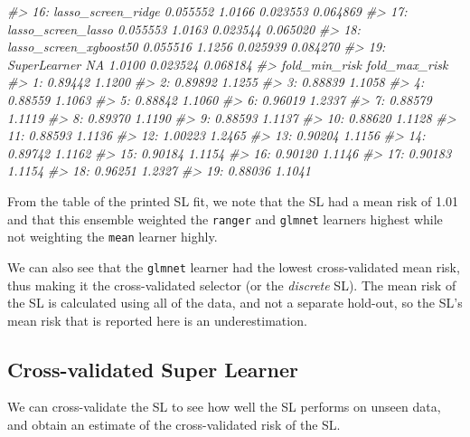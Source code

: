 \documentclass[12pt, krantz2,]{krantz}
\newenvironment{Shaded}{\begin{snugshade}}{\end{snugshade}}
\newcommand{\CommentTok}[1]{\textcolor[rgb]{0.37,0.37,0.37}{\textit{#1}}}
\theoremstyle{definition}
\theoremstyle{definition}
\theoremstyle{definition}
\newcommand{\1}{\mathbbm{1}}
\begin{document}
\begin{Shaded}
\begin{Highlighting}[]
\CommentTok{#> 16:            lasso_screen_ridge     0.055552 1.0166 0.023553 0.064869}
\CommentTok{#> 17:            lasso_screen_lasso     0.055553 1.0163 0.023544 0.065020}
\CommentTok{#> 18:        lasso_screen_xgboost50     0.055516 1.1256 0.025939 0.084270}
\CommentTok{#> 19:                  SuperLearner           NA 1.0100 0.023524 0.068184}
\CommentTok{#>     fold_min_risk fold_max_risk}
\CommentTok{#>  1:       0.89442        1.1200}
\CommentTok{#>  2:       0.89892        1.1255}
\CommentTok{#>  3:       0.88839        1.1058}
\CommentTok{#>  4:       0.88559        1.1063}
\CommentTok{#>  5:       0.88842        1.1060}
\CommentTok{#>  6:       0.96019        1.2337}
\CommentTok{#>  7:       0.88579        1.1119}
\CommentTok{#>  8:       0.89370        1.1190}
\CommentTok{#>  9:       0.88593        1.1137}
\CommentTok{#> 10:       0.88620        1.1128}
\CommentTok{#> 11:       0.88593        1.1136}
\CommentTok{#> 12:       1.00223        1.2465}
\CommentTok{#> 13:       0.90204        1.1156}
\CommentTok{#> 14:       0.89742        1.1162}
\CommentTok{#> 15:       0.90184        1.1154}
\CommentTok{#> 16:       0.90120        1.1146}
\CommentTok{#> 17:       0.90183        1.1154}
\CommentTok{#> 18:       0.96251        1.2327}
\CommentTok{#> 19:       0.88036        1.1041}
\end{Highlighting}
\end{Shaded}

From the table of the printed SL fit, we note that the SL had a mean risk of
1.01 and that
this ensemble weighted the \texttt{ranger} and \texttt{glmnet} learners highest while not
weighting the \texttt{mean} learner highly.

We can also see that the \texttt{glmnet} learner had the lowest cross-validated mean
risk, thus making it the cross-validated selector (or the \emph{discrete} SL). The
mean risk of the SL is calculated using all of the data, and not a separate
hold-out, so the SL's mean risk that is reported here is an underestimation.

\hypertarget{cross-validated-super-learner}{%
\subsection*{Cross-validated Super Learner}\label{cross-validated-super-learner}}


We can cross-validate the SL to see how well the SL performs on unseen data,
and obtain an estimate of the cross-validated risk of the SL.
\end{document}
